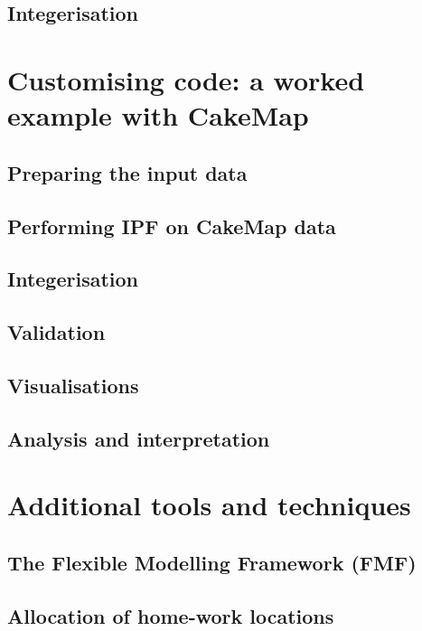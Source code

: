 \documentclass[a5paper, 11pt, twoside]{book}  %
\begin{document}
\section{Integerisation}

\chapter{Customising code: a worked example with CakeMap}


\section{Preparing the input data}

\section{Performing IPF on CakeMap data}

\section{Integerisation}

\section{Validation}

\section{Visualisations}

\section{Analysis and interpretation}


\chapter{Additional tools and techniques}


\section{The Flexible Modelling Framework (FMF)}

\section{Allocation of home-work locations}
\end{document}
